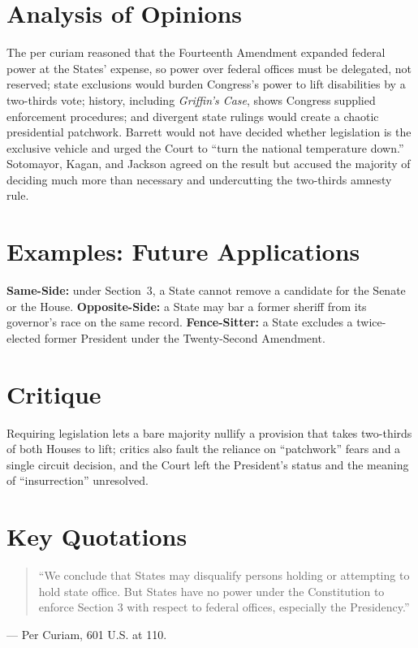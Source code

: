 \documentclass[12pt]{article}
\begin{document}
\section{Analysis of Opinions}
The per curiam reasoned that the Fourteenth Amendment expanded federal power at the States' expense, so power over federal offices must be delegated, not reserved; state exclusions would burden Congress's power to lift disabilities by a two-thirds vote; history, including \textit{Griffin's Case}, shows Congress supplied enforcement procedures; and divergent state rulings would create a chaotic presidential patchwork. Barrett would not have decided whether legislation is the exclusive vehicle and urged the Court to ``turn the national temperature down.'' Sotomayor, Kagan, and Jackson agreed on the result but accused the majority of deciding much more than necessary and undercutting the two-thirds amnesty rule.

\section{Examples: Future Applications}
\textbf{Same-Side:} under Section~3, a State cannot remove a candidate for the Senate or the House. \textbf{Opposite-Side:} a State may bar a former sheriff from its governor's race on the same record. \textbf{Fence-Sitter:} a State excludes a twice-elected former President under the Twenty-Second Amendment.

\section{Critique}
Requiring legislation lets a bare majority nullify a provision that takes two-thirds of both Houses to lift; critics also fault the reliance on ``patchwork'' fears and a single circuit decision, and the Court left the President's status and the meaning of ``insurrection'' unresolved.

\section{Key Quotations}
\begin{quote}
``We conclude that States may disqualify persons holding or attempting to hold state office. But States have no power under the Constitution to enforce Section 3 with respect to federal offices, especially the Presidency.''
\end{quote}
\noindent --- Per Curiam, 601 U.S. at 110.
\end{document}
